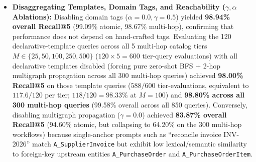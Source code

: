 \documentclass[conference,10pt]{IEEEtran}
\begin{document}
\begin{itemize}
    \item \textbf{Disaggregating Templates, Domain Tags, and Reachability ($\gamma, \alpha$ Ablations):} Disabling domain tags ($\alpha = 0.0, \gamma = 0.5$) yielded \textbf{98.94\% overall Recall@5} (99.09\% atomic, 98.67\% multi-hop), confirming that performance does not depend on hand-crafted tags. Evaluating the 120 declarative-template queries across all 5 multi-hop catalog tiers $M \in \{25, 50, 100, 250, 500\}$ ($120 \times 5 = 600$ tier-query evaluations) with all declarative templates disabled (forcing pure zero-shot BFS + 2-hop multigraph propagation across all 300 multi-hop queries) achieved \textbf{98.00\% Recall@5} on those template queries ($588/600$ tier-evaluations, equivalent to $117.6/120$ per tier; $118/120 = 98.33\%$ at $M=100$) and \textbf{98.80\% across all 300 multi-hop queries} (99.58\% overall across all 850 queries). Conversely, disabling multigraph propagation ($\gamma = 0.0$) achieved \textbf{83.87\% overall Recall@5} (94.60\% atomic, but collapsing to 64.20\% on the 300 multi-hop workflows) because single-anchor prompts such as ``reconcile invoice INV-2026'' match \texttt{A\_SupplierInvoice} but exhibit low lexical/semantic similarity to foreign-key upstream entities \texttt{A\_PurchaseOrder} and \texttt{A\_PurchaseOrderItem}.

\end{itemize}
\end{document}
